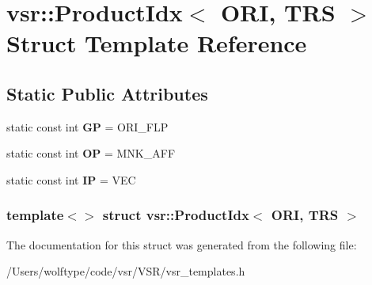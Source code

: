 \hypertarget{structvsr_1_1_product_idx_3_01_o_r_i_00_01_t_r_s_01_4}{\section{vsr\-:\-:Product\-Idx$<$ O\-R\-I, T\-R\-S $>$ Struct Template Reference}
\label{structvsr_1_1_product_idx_3_01_o_r_i_00_01_t_r_s_01_4}
}
\subsection*{Static Public Attributes}
\begin{DoxyCompactItemize}
\item 
\hypertarget{structvsr_1_1_product_idx_3_01_o_r_i_00_01_t_r_s_01_4_af6f773e6548971e609888e3063d6f422}{static const int {\bfseries G\-P} = O\-R\-I\-\_\-\-F\-L\-P}\label{structvsr_1_1_product_idx_3_01_o_r_i_00_01_t_r_s_01_4_af6f773e6548971e609888e3063d6f422}

\item 
\hypertarget{structvsr_1_1_product_idx_3_01_o_r_i_00_01_t_r_s_01_4_aa863f7ee69dfb348ebfc97d33f467b0a}{static const int {\bfseries O\-P} = M\-N\-K\-\_\-\-A\-F\-F}\label{structvsr_1_1_product_idx_3_01_o_r_i_00_01_t_r_s_01_4_aa863f7ee69dfb348ebfc97d33f467b0a}

\item 
\hypertarget{structvsr_1_1_product_idx_3_01_o_r_i_00_01_t_r_s_01_4_a34c8d7f7730631756656b2757b569e6b}{static const int {\bfseries I\-P} = V\-E\-C}\label{structvsr_1_1_product_idx_3_01_o_r_i_00_01_t_r_s_01_4_a34c8d7f7730631756656b2757b569e6b}

\end{DoxyCompactItemize}
\subsubsection*{template$<$$>$ struct vsr\-::\-Product\-Idx$<$ O\-R\-I, T\-R\-S $>$}



The documentation for this struct was generated from the following file\-:\begin{DoxyCompactItemize}
\item 
/\-Users/wolftype/code/vsr/\-V\-S\-R/vsr\-\_\-templates.\-h\end{DoxyCompactItemize}

